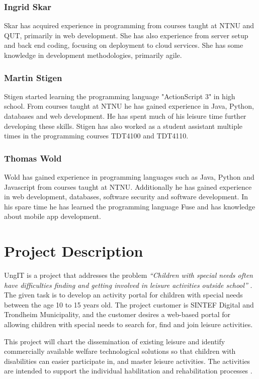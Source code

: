 \subsubsection{Ingrid Skar}
Skar has acquired experience in programming from courses taught at NTNU and QUT, primarily in web development. She has also experience from server setup and back end coding, focusing on deployment to cloud services. She has some knowledge in development methodologies, primarily agile. 

\subsubsection{Martin Stigen}
Stigen started learning the programming language "ActionScript 3" in high school. From courses taught at NTNU he has gained experience in Java, Python, databases and web development. He has spent much of his leisure time further developing these skills. Stigen has also worked as a student assistant multiple times in the programming courses TDT4100 and TDT4110.

\subsubsection{Thomas Wold}
Wold has gained experience in programming languages such as Java, Python and Javascript from courses taught at NTNU. Additionally he has gained experience in web development, databases, software security and software development. In his spare time he has learned the programming language Fuse and has knowledge about mobile app development.


\section{Project Description}
UngIT is a project that addresses the problem \textit{“Children with special needs often have difficulties finding and getting involved in leisure activities outside school”} \cite{SintefBachelorProjectDescription}. The given task is to develop an activity portal for children with special needs between the age 10 to 15 years old. The project customer is SINTEF Digital and Trondheim Municipality, and the customer desires a web-based portal for allowing children with special needs to search for, find and join leisure activities.

This project will chart the dissemination of existing leisure and identify commercially available welfare technological solutions so that children with disabilities can easier participate in, and master leisure activities. The activities are intended to support the individual habilitation and rehabilitation processes \cite{SintefOnlineProjectDescription}.

